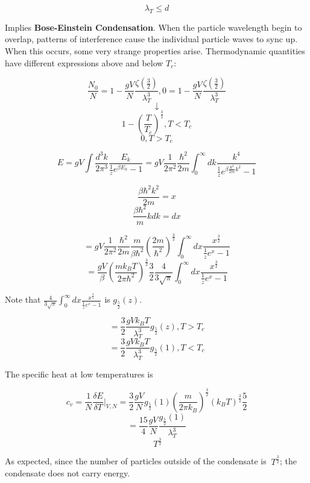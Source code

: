\documentclass{article}
\newcommand{\thermdif}[4]{\frac{\delta#1}{\delta#2}\vert_{#3,#4}}
\newcommand{\bltz}{k_{B}}
\newcommand{\dtk}{\frac{d^{3}k}{2\pi^{3}}}
\newcommand{\qmom}{\frac{\hbar^{2}}{2m}}
\begin{document}
$$\lambda_{T}\leq d$$

Implies \textbf{Bose-Einstein Condensation}.  When the particle wavelength begin to overlap, patterns of interference cause the individual particle waves to sync up.  When this occurs, some very strange properties arise.  Thermodynamic quantities have different expressions above and below $T_{c}$:

$$\frac{N_{0}}{N}=1-\frac{gV}{N}\frac{\zeta(\frac{3}{2})}{\lambda_{T}^{3}}, 0=1-\frac{gV}{N}\frac{\zeta(\frac{3}{2})}{\lambda_{T}^{3}}$$
$$\downarrow$$
$$1-(\frac{T}{T_{c}})^{\frac{3}{2}}, T<T_{c}$$
$$0, T>T_{c}$$

$$E=gV\int\dtk\frac{E_{k}}{\frac{1}{z}e^{\beta E_{k}}-1}=gV\frac{1}{2\pi^{2}}\frac{\hbar^{2}}{2m}\int_{0}^{\infty}dk\frac{k^{4}}{\frac{1}{z}e^{\beta\qmom k^{2}}-1}$$

$$\frac{\beta\hbar^{2}k^{2}}{2m}=x$$
$$\frac{\beta\hbar^{2}}{m}kdk=dx$$

$$=gV\frac{1}{2\pi^{2}}\qmom\frac{m}{\beta\hbar^{2}}(\frac{2m}{\hbar^{2}})^{\frac{3}{2}}\int_{0}^{\infty}dx\frac{x^{\frac{3}{2}}}{\frac{1}{z}e^{x}-1}$$
$$=\frac{gV}{\beta}(\frac{m\bltz T}{2\pi\hbar^{2}})^{\frac{3}{2}}\frac{3}{2}\frac{4}{3\sqrt{\pi}}\int_{0}^{\infty}dx\frac{x^{\frac{3}{2}}}{\frac{1}{z}e^{x}-1}$$

Note that $\frac{4}{3\sqrt{\pi}}\int_{0}^{\infty}dx\frac{x^{\frac{3}{2}}}{\frac{1}{z}e^{x}-1}$ is $g_{\frac{5}{2}}(z)$.

$$=\frac{3}{2}\frac{gV\bltz T}{\lambda_{T}^{3}}g_{\frac{5}{2}}(z), T>T_{c}$$
$$=\frac{3}{2}\frac{gV\bltz T}{\lambda_{T}^{3}}g_{\frac{5}{2}}(1), T<T_{c}$$

The specific heat at low temperatures is

$$c_{v}=\frac{1}{N}\thermdif{E}{T}{V}{N}=\frac{3}{2}\frac{gV}{N}g_{\frac{5}{2}}(1)(\frac{m}{2\pi\bltz})^{\frac{3}{2}}(\bltz T)^{\frac{3}{2}}\frac{5}{2}$$
$$=\frac{15}{4}\frac{gV}{N}\frac{g_{\frac{5}{2}}(1)}{\lambda_{T}^{3}}$$
$$~T^{\frac{3}{2}}$$

As expected, since the number of particles outside of the condensate is $~T^{\frac{3}{2}}$; the condensate does not carry energy.
\end{document}
